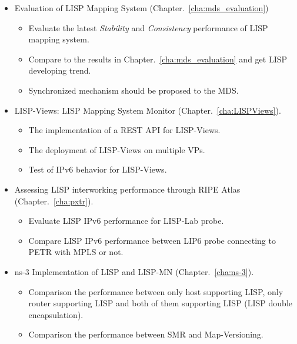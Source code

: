 \begin{itemize}[noitemsep,topsep=0pt]
    \item Evaluation of LISP Mapping System (Chapter.~\ref{cha:mds_evaluation})
    \begin{itemize}[noitemsep,topsep=0pt]
        \item Evaluate the latest \emph{Stability} and \emph{Consistency} performance of LISP mapping system. 
        \item Compare to the results in Chapter.~\ref{cha:mds_evaluation} and get LISP developing trend.
        \item Synchronized mechanism should be proposed to the MDS.
    \end{itemize}
    
    \item LISP-Views: LISP Mapping System Monitor (Chapter.~\ref{cha:LISPViews}).
    \begin{itemize}[noitemsep,topsep=0pt]
        \item The implementation of a REST API for LISP-Views.
        \item The deployment of LISP-Views on multiple VPs.
        \item Test of IPv6 behavior for LISP-Views.
    \end{itemize}
    
    \item Assessing LISP interworking performance through RIPE Atlas (Chapter.~\ref{cha:pxtr}).
    \begin{itemize}[noitemsep,topsep=0pt]
        \item Evaluate LISP IPv6 performance for LISP-Lab probe.
        \item Compare LISP IPv6 performance between LIP6 probe connecting to PETR with MPLS or not.
    \end{itemize}
    
    \item ns-3 Implementation of LISP and LISP-MN (Chapter.~\ref{cha:ns-3}).
    \begin{itemize}[noitemsep,topsep=0pt]
        \item Comparison the performance between only host supporting LISP, only router supporting LISP and both of them supporting LISP (LISP double encapsulation).
        \item Comparison the performance between SMR and Map-Versioning.
    \end{itemize}
\end{itemize}